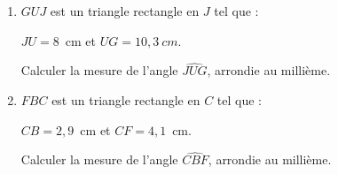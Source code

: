 \begin{minipage}{0.99\linewidth}

\exo



  \begin{multicols}{2}
    \begin{enumerate}
    \item $GUJ$ est un triangle rectangle en $J$ tel que :\par
      $JU=8$~cm et $UG=10,3~cm$.\par
      Calculer la mesure de l'angle $\widehat{JUG}$, arrondie au millième.\par
      \columnbreak
     \item $FBC$ est un triangle rectangle en $C$ tel que :\par
      $CB=2,9$~cm et $CF=4,1$~cm.\par
      Calculer la mesure de l'angle $\widehat{CBF}$, arrondie au millième.\par
    
    \end{enumerate}
  \end{multicols}

\end{minipage}

\vspace{0.5cm}
